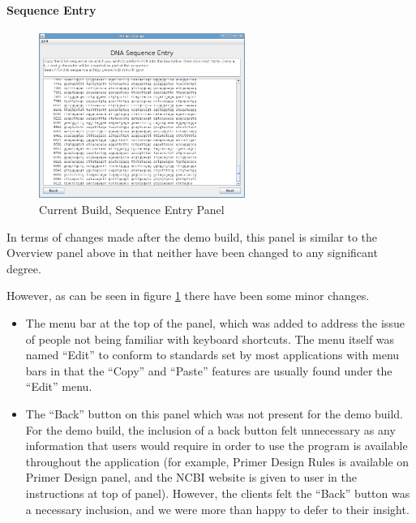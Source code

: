 \paragraph{Sequence Entry}

\begin{figure}[!t]
  \begin{center}
    \includegraphics[width=0.6\textwidth]{./images/currentBuild/sequenceEntry.png}
    \caption{
      \label{fig:currentBuild:sequenceEntry}
      Current Build, Sequence Entry Panel
    }
  \end{center}
\end{figure}

In terms of changes made after the demo build, this panel is similar
to the Overview panel above in that neither have been changed to any
significant degree.

However, as can be seen in figure \ref{fig:currentBuild:sequenceEntry}
there have been some minor changes.

\begin{itemize}
\item The menu bar at the top of the panel, which was added to
address the issue of people not being familiar with keyboard
shortcuts.
The menu itself was named ``Edit'' to conform to standards set by most
applications with menu bars in that the ``Copy'' and ``Paste''
features are usually found under the ``Edit'' menu.

\item The ``Back'' button on this panel which was not present for
the demo build.
For the demo build, the inclusion of a back button felt unnecessary as
any information that users would require in order to use the 
program is available throughout the application (for example, Primer Design 
Rules is available on Primer Design panel, and the NCBI website \cite{ncbi}
is given to user in the instructions at top of panel).
However, the clients felt the ``Back'' button was a necessary inclusion, and
we were more than happy to defer to their insight.
\end{itemize}

